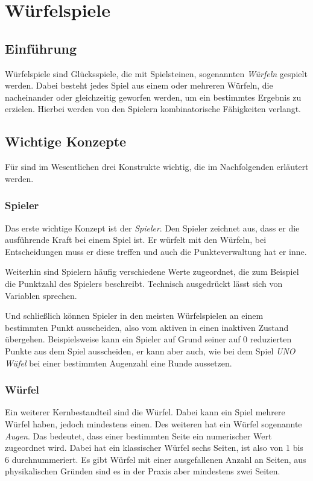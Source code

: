 
\chapter{Würfelspiele}
\label{cha:wurfelspiele}

\section{Einführung}
\label{sec:einfuhrung}
	Würfelspiele sind Glücksspiele, die mit Spielsteinen, sogenannten \emph{Würfeln} gespielt werden. Dabei besteht jedes Spiel aus einem oder mehreren Würfeln, die nacheinander oder gleichzeitig geworfen werden, um ein bestimmtes Ergebnis zu erzielen. Hierbei werden von den Spielern kombinatorische Fähigkeiten verlangt.

\section{Wichtige Konzepte}
\label{sec:wichtige_konzepte}
	Für \dg sind im Wesentlichen drei Konstrukte wichtig, die im Nachfolgenden erläutert werden.

	\subsection{Spieler}
	\label{sub:spieler}
		Das erste wichtige Konzept ist der \emph{Spieler}. Den Spieler zeichnet aus, dass er die ausführende Kraft bei einem Spiel ist. Er würfelt mit den Würfeln, bei Entscheidungen muss er diese treffen und auch die Punkteverwaltung hat er inne.

        Weiterhin sind Spielern häufig verschiedene Werte zugeordnet, die zum Beispiel die Punktzahl des Spielers beschreibt. Technisch ausgedrückt lässt sich von Variablen sprechen.

		Und schließlich können Spieler in den meisten Würfelspielen an einem bestimmten Punkt ausscheiden, also vom aktiven in einen inaktiven Zustand übergehen. Beispielsweise kann ein Spieler auf Grund seiner auf 0 reduzierten Punkte aus dem Spiel ausscheiden, er kann aber auch, wie bei dem Spiel \emph{UNO Wüfel} bei einer bestimmten Augenzahl eine Runde aussetzen.

	\subsection{Würfel}
	\label{sub:wurfel}
		Ein weiterer Kernbestandteil sind die Würfel. Dabei kann ein Spiel mehrere Würfel haben, jedoch mindestens einen. Des weiteren hat ein Würfel sogenannte \emph{Augen}. Das bedeutet, dass einer bestimmten Seite ein numerischer Wert zugeordnet wird. Dabei hat ein klassischer Würfel sechs Seiten, ist also von 1 bis 6 durchnummeriert. Es gibt Würfel mit einer ausgefallenen Anzahl an Seiten, aus physikalischen Gründen sind es in der Praxis aber mindestens  zwei Seiten.

